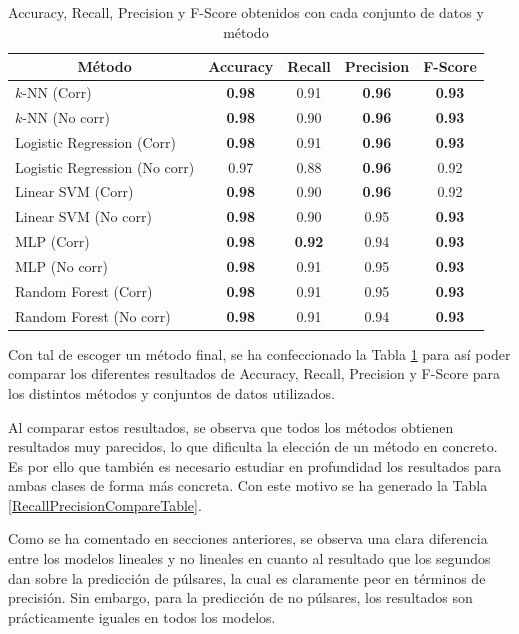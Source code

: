 \documentclass[a4paper]{article} %
\begin{document}
\begin{table}[H]
\centering
\begin{tabular}{lcccc}
\hline
\multicolumn{1}{c}{Método} & Accuracy & Recall & Precision & F-Score \\ \hline
$k$-NN (Corr) & \textbf{0.98} & 0.91 & \textbf{0.96} & \textbf{0.93} \\
$k$-NN (No corr) & \textbf{0.98} & 0.90 & \textbf{0.96} & \textbf{0.93} \\
Logistic Regression (Corr) & \textbf{0.98} & 0.91 & \textbf{0.96} & \textbf{0.93} \\
Logistic Regression (No corr) & 0.97 & 0.88 & \textbf{0.96} & 0.92 \\
Linear SVM (Corr) & \textbf{0.98} & 0.90 & \textbf{0.96} & 0.92 \\
Linear SVM (No corr) & \textbf{0.98} & 0.90 & 0.95 & \textbf{0.93} \\
MLP (Corr) & \textbf{0.98} & \textbf{0.92} & 0.94 & \textbf{0.93} \\
MLP (No corr) & \textbf{0.98} & 0.91 & 0.95 & \textbf{0.93} \\
Random Forest (Corr) & \textbf{0.98} & 0.91 & 0.95 & \textbf{0.93} \\
Random Forest (No corr) & \textbf{0.98} & 0.91 & 0.94 & \textbf{0.93} \\ \hline
\end{tabular}
\caption{Accuracy, Recall, Precision y F-Score obtenidos con cada conjunto de datos y método}
\label{TotalCompareTable}
\end{table}

Con tal de escoger un método final, se ha confeccionado la Tabla \ref{TotalCompareTable} para así poder comparar los diferentes resultados de Accuracy, Recall, Precision y F-Score para los distintos métodos y conjuntos de datos utilizados. \vspace{5mm}

Al comparar estos resultados, se observa que todos los métodos obtienen resultados muy parecidos, lo que dificulta la elección de un método en concreto. Es por ello que también es necesario estudiar en profundidad los resultados para ambas clases de forma más concreta. Con este motivo se ha generado la Tabla \ref{RecallPrecisionCompareTable}. \vspace{5mm}

Como se ha comentado en secciones anteriores, se observa una clara diferencia entre los modelos lineales y no lineales en cuanto al resultado que los segundos dan sobre la predicción de púlsares, la cual es claramente peor en términos de precisión. Sin embargo, para la predicción de no púlsares, los resultados son prácticamente iguales en todos los modelos. \vspace{5mm}
\end{document}

